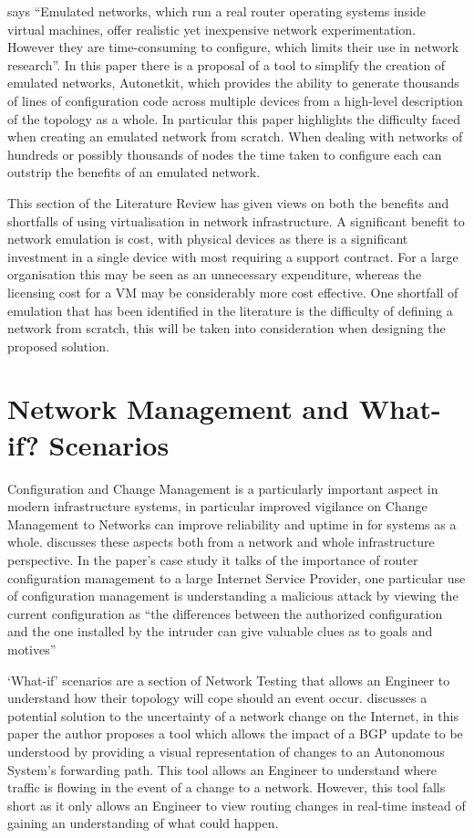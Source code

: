 \documentclass[11pt]{report}
\begin{document}
\citep{Knight:2012:ASL:2342356.2342378} says ``Emulated networks, which run a real router operating systems inside virtual machines, offer realistic yet inexpensive network experimentation. However they are time-consuming to configure, which limits their use in network research''. In this paper there is a proposal of a tool to simplify the creation of emulated networks, Autonetkit, which provides the ability to generate thousands of lines of configuration code across multiple devices from a high-level description of the topology as a whole. In particular this paper highlights the difficulty faced when creating an emulated network from scratch. When dealing with networks of hundreds or possibly thousands of nodes the time taken to configure each can outstrip the benefits of an emulated network.

This section of the Literature Review has given views on both the benefits and shortfalls of using virtualisation in network infrastructure. A significant benefit to network emulation is cost, with physical devices as there is a significant investment in a single device with most requiring a support contract. For a large organisation this may be seen as an unnecessary expenditure, whereas the licensing cost for a VM may be considerably more cost effective. One shortfall of emulation that has been identified in the literature is the difficulty of defining a network from scratch, this will be taken into consideration when designing the proposed solution.

\section{Network Management and What-if? Scenarios}

Configuration and Change Management is a particularly important aspect in modern infrastructure systems, in particular improved vigilance on Change Management to Networks can improve reliability and uptime in for systems as a whole. \citep[p.270-273]{bellovin2009configuration} discusses these aspects both from a network and whole infrastructure perspective. In the paper's case study it talks of the importance of router configuration management to a large Internet Service Provider, one particular use of configuration management is understanding a malicious attack by viewing the current configuration as ``the differences between the authorized configuration and the one installed by the intruder can give valuable clues as to goals and motives''

`What-if' scenarios are a section of Network Testing that allows an Engineer to understand how their topology will cope should an event occur. \citep{lad2006visualizing} discusses a potential solution to the uncertainty of a network change on the Internet, in this paper the author proposes a tool which allows the impact of a BGP update to be understood by providing a visual representation of changes to an Autonomous System's forwarding path. This tool allows an Engineer to understand where traffic is flowing in the event of a change to a network. However, this tool falls short as it only allows an Engineer to view routing changes in real-time instead of gaining an understanding of what could happen.
\end{document}
